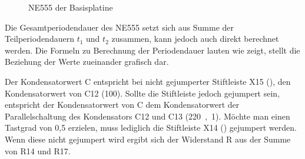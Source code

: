 \begin{figure}[H]
    \centering
    \qquad
    \qquad
    \caption[NE555 der Basisplatine]{NE555 der \gls{Basisplatine}}
    \label{fig:basisplatine-ne555}
\end{figure}

Die Gesamtperiodendauer des NE555 setzt sich aus Summe der Teilperiodendauern $t_1$ und $t_2$ zusammen, kann jedoch auch direkt berechnet werden. Die Formeln zu Berechnung der Periodendauer lauten wie  zeigt,  stellt die Beziehung der Werte zueinander grafisch dar.



Der Kondensatorwert C entspricht bei nicht gejumperter Stiftleiste X15 (), den Kondensatorwert von C12 (\unit{100}{\nano\farad}). Sollte die Stiftleiste jedoch gejumpert sein, entspricht der Kondensatorwert von C dem Kondensatorwert der Parallelschaltung des Kondensators C12 und C13 (\unit{220,1}{\micro\farad}). Möchte man einen Tastgrad von 0,5 erzielen, muss lediglich die Stiftleiste X14 () gejumpert werden. Wenn diese nicht gejumpert wird ergibt sich der Widerstand R aus der Summe von R14 und R17.


